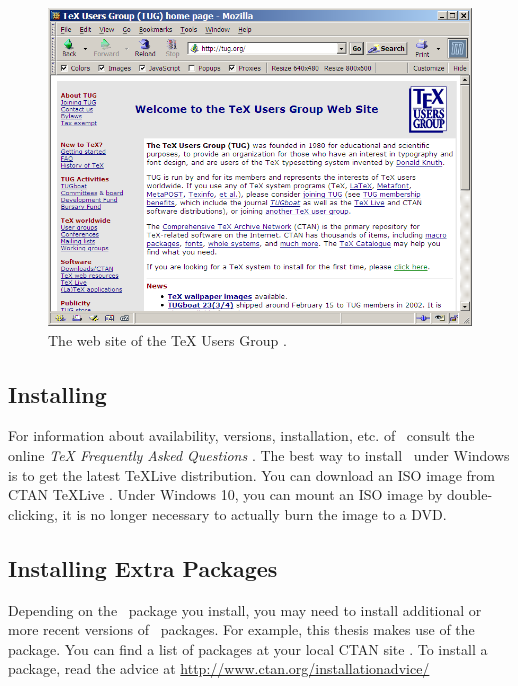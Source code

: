 \begin{figure}[tp]
\centering
\includegraphics[keepaspectratio,width=\linewidth,height=\halfh]
{images/tugorg.png}

\caption[TeX Users Group web site]{
The web site of the TeX Users Group \parencite{TUG}.
}
\label{fig:TUG}
\end{figure}




\subsection{Installing \protect\LaTeXe}

For information about availability, versions, installation, etc. of
\LaTeXe\ consult the online
\emph{TeX Frequently Asked Questions} \parencite{TeXfaq}.
%
The best way to install \LaTeXe\ under Windows is to get the latest
TeXLive \parencite{texlive} distribution. You can download an ISO
image from CTAN TeXLive \parencite{ctan-texlive}.  Under Windows 10,
you can mount an ISO image by double-clicking, it is no longer
necessary to actually burn the image to a DVD.





\subsection{Installing Extra \protect\LaTeXe Packages}

Depending on the \LaTeXe\ package you install, you may need to install
additional or more recent versions of \LaTeXe\ packages. For example,
this thesis makes use of the \LaTeXe\  package.
%
You can find a list of packages at your local CTAN site \parencite{CTAN}.
To install a package, read the advice at
\url{http://www.ctan.org/installationadvice/}





